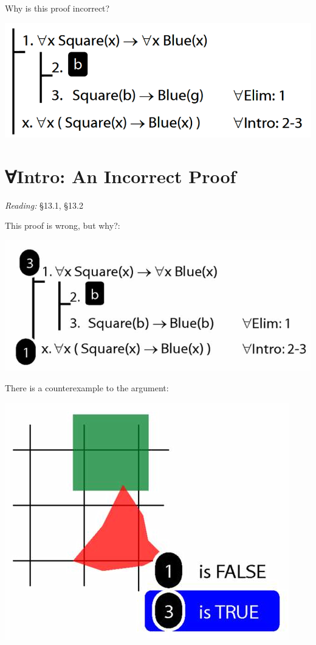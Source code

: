 \documentclass[12pt]{extarticle}
\begin{document}
\begin{multicols*}{3}
\begin{minipage}{\columnwidth}
Why is this proof incorrect?
 
\begin{center}
\includegraphics[scale=0.3]{img/proof_universal_intro_incorrect.png}
\end{center}
\end{minipage}
 
 
 
\section{∀Intro: An Incorrect Proof}
 
\emph{Reading:} §13.1, §13.2
 
This proof is wrong, but why?:
 
\begin{center}
\includegraphics[scale=0.3]{img/unit_572_proof.png}
\end{center}
There is a counterexample to the argument:
 
\begin{center}
\includegraphics[scale=0.3]{img/unit_572_proof2.png}
\end{center}
\vfill
\begin{minipage}{\columnwidth}

\end{minipage}
\end{multicols*}
\end{document}
